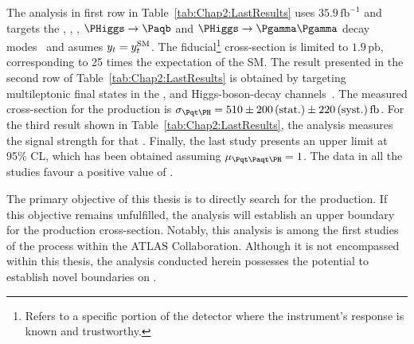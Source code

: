 The  analysis in first row in Table~\ref{tab:Chap2:LastResults} uses $35.9\,\text{fb}^{-1}$ 
and targets the \HWW, \Htautau, \HZZ, $\PHiggs\rightarrow \bbar$ and 
$\PHiggs\rightarrow \Pgamma \Pgamma$ decay modes~\cite{CMS:2018jeh}
and asumes $y_{t} = y_{t}^{\text{SM}}$.
The fiducial\footnote{Refers to a specific portion of the detector where 
the instrument's response is known and trustworthy.} cross-section is limited to
$1.9\,\text{pb}$, corresponding to 25 times the expectation of the SM.
The result presented in the second row of Table~\ref{tab:Chap2:LastResults} 
is obtained by targeting multileptonic final states in the \HWW, \Htautau and \HZZ
Higgs-boson-decay channels~\cite{CMS:2020mpn}. %
The measured cross-section for the \tH production is
$\sigma_{\tH} = 510\pm 200\,\text{(stat.)} \pm 220 \,\text{(syst.)}\,\text{fb}$.
For the third result shown in Table~\ref{tab:Chap2:LastResults}, the 
analysis measures
the signal strength for that \tH. %
Finally, the last study presents an upper limit at 95\% CL, which has
been obtained assuming $\mu_{\ttH}=1$.
The data in all the studies favour a positive value of \yt. 






The primary objective of this thesis is to directly search for the \tHq production. 
If this objective remains unfulfilled, the analysis will establish an upper boundary 
for the production cross-section. Notably, this analysis is among the first studies 
of the \tHq process within the ATLAS Collaboration. 
Although it is not encompassed within this thesis, the analysis conducted herein 
possesses the potential to establish novel boundaries on \yt.


\begin{comment}






\end{comment}
